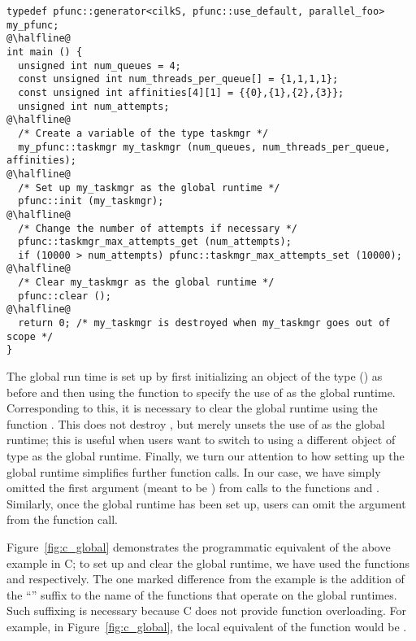 \begin{lstlisting}
typedef pfunc::generator<cilkS, pfunc::use_default, parallel_foo> my_pfunc;
@\halfline@
int main () {
  unsigned int num_queues = 4;
  const unsigned int num_threads_per_queue[] = {1,1,1,1};
  const unsigned int affinities[4][1] = {{0},{1},{2},{3}};
  unsigned int num_attempts;
@\halfline@
  /* Create a variable of the type taskmgr */
  my_pfunc::taskmgr my_taskmgr (num_queues, num_threads_per_queue, affinities);
@\halfline@
  /* Set up my_taskmgr as the global runtime */
  pfunc::init (my_taskmgr);
@\halfline@
  /* Change the number of attempts if necessary */
  pfunc::taskmgr_max_attempts_get (num_attempts);
  if (10000 > num_attempts) pfunc::taskmgr_max_attempts_set (10000);
@\halfline@
  /* Clear my_taskmgr as the global runtime */
  pfunc::clear ();
@\halfline@
  return 0; /* my_taskmgr is destroyed when my_taskmgr goes out of scope */
}
\end{lstlisting}
%
The global run time is set up by first initializing an object of the type
 () as before and then using the function
 to specify the use of  as the global runtime. 
%
Corresponding to this, it is necessary to clear the global runtime using the
function . This does not destroy , but merely
unsets the use of  as the global runtime; this is useful when
users want to switch to using a different object of type  as the
global runtime. 
%
Finally, we turn our attention to how setting up the global 
runtime simplifies further function calls. 
%
In our case, we have simply omitted the first argument (meant to be
) from calls to the functions 
and . 
%
Similarly, once the global runtime has been set up, users can omit the
 argument from the function call.

Figure~\ref{fig:c_global} demonstrates the programmatic equivalent of the above
example in C; to set up and clear the global runtime, we have used the
functions  and  respectively. 
%
The one marked difference from the \Cpp{} example is the addition of the
``'' suffix to the name of the functions that operate on the global
runtimes. 
%
Such suffixing is necessary because C does not provide function overloading. 
%
For example, in Figure~\ref{fig:c_global}, the local equivalent of the function
 would be
.

